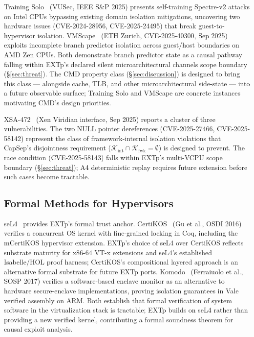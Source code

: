 \documentclass[conference]{IEEEtran}
\newcommand{\Kint}{\mathcal{K}_\text{int}}
\newcommand{\Kfwk}{\mathcal{K}_\text{fwk}}
\begin{document}
Training Solo~\cite{barberis2025trainingsolo} (VUSec, IEEE S\&P
2025) presents self-training Spectre-v2 attacks on Intel CPUs
bypassing existing domain isolation mitigations, uncovering two
hardware issues (CVE-2024-28956, CVE-2025-24495) that break
guest-to-hypervisor isolation. VMScape~\cite{vmscape2025} (ETH
Zurich, CVE-2025-40300, Sep 2025) exploits incomplete branch
predictor isolation across guest/host boundaries on AMD Zen CPUs.
Both demonstrate branch predictor state as a causal pathway falling
within EXTp's declared silent microarchitectural channels scope
boundary (\S\ref{sec:threat}). The CMD property class
(\S\ref{sec:discussion}) is designed to bring this class ---
alongside cache, TLB, and other microarchitectural side-state ---
into a future observable surface; Training Solo and VMScape are
concrete instances motivating CMD's design priorities.

XSA-472~\cite{xsa472} (Xen Viridian interface, Sep 2025) reports a
cluster of three vulnerabilities. The two NULL pointer dereferences
(CVE-2025-27466, CVE-2025-58142) represent the class of
framework-internal isolation violations that CapSep's disjointness
requirement ($\Kint \cap \Kfwk = \emptyset$) is designed to prevent.
The race condition (CVE-2025-58143) falls within EXTp's multi-VCPU
scope boundary (\S\ref{sec:threat}); A4 deterministic replay
requires future extension before such cases become tractable.

\subsection{Formal Methods for Hypervisors}

seL4~\cite{klein2009sel4,klein2014sel4} provides EXTp's formal trust
anchor. CertiKOS~\cite{gu2016certikos} (Gu et al., OSDI 2016)
verifies a concurrent OS kernel with fine-grained locking in Coq,
including the mCertiKOS hypervisor extension. EXTp's choice of seL4
over CertiKOS reflects substrate maturity for x86-64 VT-x extensions
and seL4's established Isabelle/HOL proof harness; CertiKOS's
compositional layered approach is an alternative formal substrate
for future EXTp ports. Komodo~\cite{ferraiuolo2017komodo}
(Ferraiuolo et al., SOSP 2017) verifies a software-based enclave
monitor as an alternative to hardware secure-enclave implementations,
proving isolation guarantees in Vale verified assembly on ARM. Both
establish that formal verification of system software in the
virtualization stack is tractable; EXTp builds on seL4 rather than
providing a new verified kernel, contributing a formal soundness
theorem for causal exploit analysis.
\end{document}
